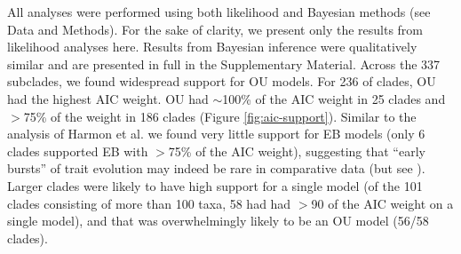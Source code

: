 \documentclass[a4paper,12pt]{article}
\begin{document}
All analyses were performed using both likelihood and Bayesian methods (see Data and Methods). For the sake of clarity, we present only the results from likelihood analyses here. Results from Bayesian inference were qualitatively similar and are presented in full in the Supplementary Material. Across the 337 subclades, we found widespread support for OU
models. For 236 of clades, OU had the highest AIC weight.
OU had $\sim$100\% of the AIC weight in 25 clades and $>$75\% of the weight in 186 clades (Figure \ref{fig:aic-support}). Similar to the analysis of Harmon et al. \citep{Harmon2010} we found very little support for EB models (only 6 clades supported EB with $>$75\% of the AIC weight), suggesting that ``early bursts'' of trait evolution may indeed be rare in comparative data (but see \citep{SlaterPennell}). Larger clades were
likely to have high support for a single model (of the 101 clades consisting of more than 100 taxa, 58 had had $>$90 of the AIC weight on a single model),
and that was overwhelmingly likely to be an OU model (56/58 clades). 
\end{document}
